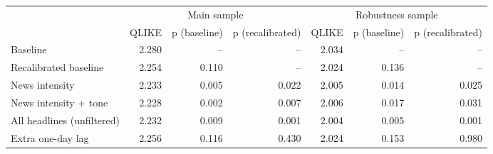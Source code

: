 \begin{tabular}{lrrrrrr}
\toprule
 & \multicolumn{3}{c}{Main sample} & \multicolumn{3}{c}{Robustness sample} \\
 & QLIKE & p (baseline) & p (recalibrated) & QLIKE & p (baseline) & p (recalibrated) \\
\midrule
Baseline & 2.280 & -- & -- & 2.034 & -- & -- \\
Recalibrated baseline & 2.254 & 0.110 & -- & 2.024 & 0.136 & -- \\
News intensity & 2.233 & 0.005 & 0.022 & 2.005 & 0.014 & 0.025 \\
News intensity + tone & 2.228 & 0.002 & 0.007 & 2.006 & 0.017 & 0.031 \\
All headlines (unfiltered) & 2.232 & 0.009 & 0.001 & 2.004 & 0.005 & 0.001 \\
Extra one-day lag & 2.256 & 0.116 & 0.430 & 2.024 & 0.153 & 0.980 \\
\bottomrule
\end{tabular}
